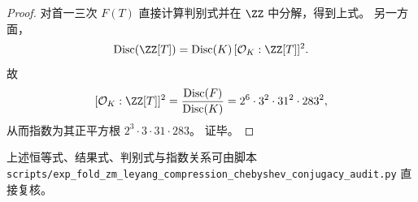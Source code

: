 \begin{proof}
对首一三次 \(F(T)\) 直接计算判别式并在 \(\ZZ\) 中分解，得到上式。
另一方面，
\[
\mathrm{Disc}(\ZZ[T])=\mathrm{Disc}(K)\,[\mathcal O_K:\ZZ[T]]^2.
\]
故
\[
[\mathcal O_K:\ZZ[T]]^2
=\frac{\mathrm{Disc}(F)}{\mathrm{Disc}(K)}
=2^6\cdot 3^2\cdot 31^2\cdot 283^2,
\]
从而指数为其正平方根
\(
2^3\cdot 3\cdot 31\cdot 283
\)。
证毕。
\end{proof}

\begin{remark}[可复现核验]\label{rem:xi-terminal-zm-leyang-chebyshev-square-descent-audit}
上述恒等式、结果式、判别式与指数关系可由脚本
\texttt{scripts/exp\_fold\_zm\_leyang\_compression\_chebyshev\_conjugacy\_audit.py}
直接复核。
\end{remark}

\endinput

